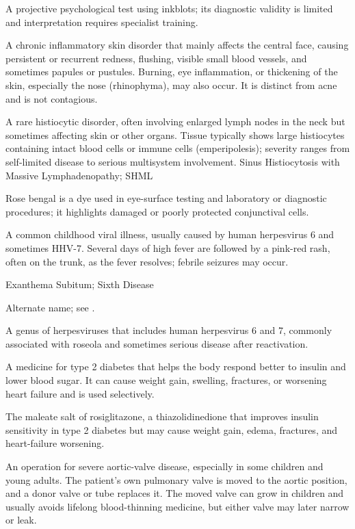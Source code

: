  A projective psychological test using inkblots; its diagnostic validity is limited and interpretation requires specialist training.

 A chronic inflammatory skin disorder that mainly affects the central face, causing persistent or recurrent redness, flushing, visible small blood vessels, and sometimes papules or pustules. Burning, eye inflammation, or thickening of the skin, especially the nose (rhinophyma), may also occur. It is distinct from acne and is not contagious.

 A rare histiocytic disorder, often involving enlarged lymph nodes in the neck but sometimes affecting skin or other organs. Tissue typically shows large histiocytes containing intact blood cells or immune cells (emperipolesis); severity ranges from self-limited disease to serious multisystem involvement.
\synonyms
Sinus Histiocytosis with Massive Lymphadenopathy; SHML

 Rose bengal is a dye used in eye-surface testing and laboratory or diagnostic procedures; it highlights damaged or poorly protected conjunctival cells.

 A common childhood viral illness, usually caused by human herpesvirus 6 and sometimes HHV-7. Several days of high fever are followed by a pink-red rash, often on the trunk, as the fever resolves; febrile seizures may occur.

\synonyms
Exanthema Subitum; Sixth Disease

 Alternate name; see .

 A genus of herpesviruses that includes human herpesvirus 6 and 7, commonly associated with roseola and sometimes serious disease after reactivation.

 A medicine for type 2 diabetes that helps the body respond better to insulin and lower blood sugar. It can cause weight gain, swelling, fractures, or worsening heart failure and is used selectively.

 The maleate salt of rosiglitazone, a thiazolidinedione that improves insulin sensitivity in type 2 diabetes but may cause weight gain, edema, fractures, and heart-failure worsening.

 An operation for severe aortic-valve disease, especially in some children and young adults. The patient’s own pulmonary valve is moved to the aortic position, and a donor valve or tube replaces it. The moved valve can grow in children and usually avoids lifelong blood-thinning medicine, but either valve may later narrow or leak.

